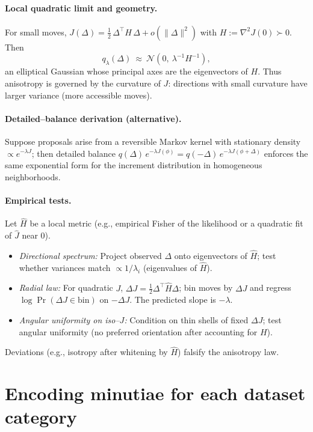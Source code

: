\documentclass[11pt,a4paper]{article}
\begin{document}
\paragraph{Local quadratic limit and geometry.}
For small moves, $J(\Delta)=\tfrac12\,\Delta^\top H\,\Delta + o(\|\Delta\|^2)$ with $H:=\nabla^2 J(0)\succ 0$. Then
\[
q_\lambda(\Delta)\ \approx\ \mathcal{N}\!\left(0,\ \lambda^{-1}H^{-1}\right),
\]
an elliptical Gaussian whose principal axes are the eigenvectors of $H$. Thus anisotropy is governed by the curvature of $J$: directions with small curvature have larger variance (more accessible moves).

\paragraph{Detailed–balance derivation (alternative).}
Suppose proposals arise from a reversible Markov kernel with stationary density $\propto e^{-\lambda J}$; then detailed balance $q(\Delta)\,e^{-\lambda J(\phi)}=q(-\Delta)\,e^{-\lambda J(\phi+\Delta)}$ enforces the same exponential form for the increment distribution in homogeneous neighborhoods.

\paragraph{Empirical tests.}
Let $\widehat H$ be a local metric (e.g., empirical Fisher of the likelihood or a quadratic fit of $\widehat J$ near $0$).
\begin{itemize}
\item \emph{Directional spectrum:} Project observed $\Delta$ onto eigenvectors of $\widehat H$; test whether variances match $\propto 1/\widehat\lambda_i$ (eigenvalues of $\widehat H$).
\item \emph{Radial law:} For quadratic $J$, $\Delta J=\tfrac12\Delta^\top \widehat H \Delta$; bin moves by $\Delta J$ and regress $\log \Pr(\Delta J\in \text{bin})$ on $-\Delta J$. The predicted slope is $-\lambda$.
\item \emph{Angular uniformity on iso–$J$:} Condition on thin shells of fixed $\Delta J$; test angular uniformity (no preferred orientation after accounting for $H$).
\end{itemize}
Deviations (e.g., isotropy after whitening by $\widehat H$) falsify the anisotropy law.

\section{Encoding minutiae for each dataset category}
\label{app:encoding}
\end{document}
